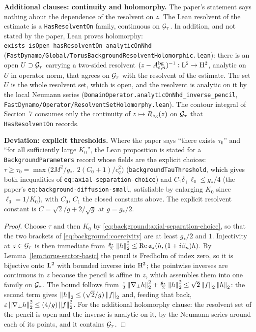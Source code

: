 \textbf{Additional clauses: continuity and holomorphy.}  The paper's statement says nothing about
the dependence of the resolvent on $z$.  The Lean resolvent of the estimate is a
\texttt{HasResolventOn} family, continuous on $\mathcal{G}_\tau$.  In addition, and not stated by the
paper, Lean proves holomorphy: \texttt{exists\_isOpen\_hasResolventOn\_analyticOnNhd}
(\texttt{FastDynamo/Global/TorusBackgroundResolventHolomorphic.lean}): there is an open
$U\supset\mathcal{G}_\tau$ carrying a two-sided resolvent $(z-A^{\rm bg}_{\varepsilon,n})^{-1}:\mathrm{L}^2\to\mathrm{H}^2$,
analytic on $U$ in operator norm, that agrees on $\mathcal{G}_\tau$ with the resolvent of the
estimate.  The set $U$ is the whole resolvent set, which is open, and the resolvent is analytic
on it by the local Neumann series
(\texttt{DomainOperator.analyticOnNhd\_inverse\_pencil},
\texttt{FastDynamo/Operator/ResolventSetHolomorphy.lean}).  The contour integral of Section~7
consumes only the continuity of $z\mapsto R_{\rm bg}(z)$ on $\mathcal{G}_\tau$ that
\texttt{HasResolventOn} records.

\textbf{Deviation: explicit thresholds.}  Where the paper says ``there exists $\tau_0$'' and
``for all sufficiently large $K_0$'', the Lean proposition is stated for a
\texttt{BackgroundParameters} record whose fields are the explicit choices:
$\tau\geq\tau_0=\max\bigl(2M^2/g_*,\,2(C_0+1)/c_q^2\bigr)$
(\texttt{backgroundTauThreshold}, which gives both inequalities of
\texttt{eq:axial-separation-choice}) and $C_1\delta_+\ell_0\leq g_*/4$ (the paper's
\texttt{eq:background-diffusion-small}, satisfiable by enlarging $K_0$ since $\ell_0=1/K_0$),
with $C_0$, $C_1$ the closed constants above.  The explicit resolvent constant is
$C=\sqrt2/g+2/\sqrt g$ at $g=g_*/2$.

\begin{proof}
  \leanok
  Choose $\tau$ and then $K_0$ by \eqref{eq:background:axial-separation-choice}, so that
  the two brackets of \eqref{eq:background:coercivity} are at least $g_*/2$ and $1$.
  Injectivity at $z\in\mathcal{G}_\tau$ is then immediate from
  $\tfrac{g_*}2\left\|h\right\|_2^2\leq\operatorname{Re}\mathfrak a_z(h,(1+i\beta_n)h)$.  By
  Lemma~\ref{lem:torus-sector-basic} the pencil is Fredholm of index zero, so it is
  bijective onto $\mathrm{L}^2$ with bounded inverse into $\mathrm{H}^2$; the pointwise inverses are
  continuous in $z$ because the pencil is affine in $z$, which assembles them into one
  family on $\mathcal{G}_\tau$.  The bound follows from
  $\tfrac{\varepsilon}2\left\|\nabla_\perp h\right\|_2^2+\tfrac{g_*}2\left\|h\right\|_2^2\leq\sqrt2\left\|f\right\|_2\left\|h\right\|_2$:
  the second term gives $\left\|h\right\|_2\leq(\sqrt2/g)\left\|f\right\|_2$ and, feeding that back,
  $\varepsilon\left\|\nabla_\perp h\right\|_2^2\leq(4/g)\left\|f\right\|_2^2$.  For the additional holomorphy clause:
  the resolvent set of the pencil is open and the inverse is analytic on it, by the Neumann
  series around each of its points, and it contains $\mathcal{G}_\tau$.
\end{proof}

